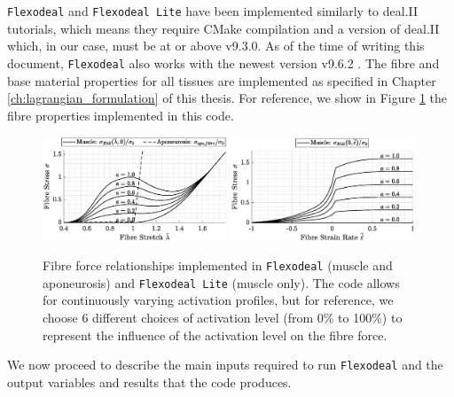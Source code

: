 \documentclass{sfuthesis}
\numberwithin{equation}{section}
\numberwithin{figure}{chapter}
\numberwithin{table}{chapter}
\theoremstyle{definition}
\begin{document}
\texttt{Flexodeal} and \texttt{Flexodeal Lite} have been implemented similarly to deal.II tutorials, which means they require CMake compilation and a version of deal.II which, in our case, must be at or above v9.3.0. As of the time of writing this document, \texttt{Flexodeal} also works with the newest version v9.6.2 \cite{dealii962}. The fibre and base material properties for all tissues are implemented as specified in Chapter \ref{ch:lagrangian_formulation} of this thesis. For reference, we show in Figure \ref{fig:FL_curves_diff_act} the fibre properties implemented in this code.

\begin{figure}
    \centering
    \includegraphics[width=0.49\textwidth]{fibre-FL-diff-a.eps}
    \includegraphics[width=0.49\textwidth]{fibre-FV-diff-a.eps}
    \caption{Fibre force relationships implemented in \texttt{Flexodeal} (muscle and aponeurosis) and \texttt{Flexodeal Lite} (muscle only). The code allows for continuously varying activation profiles, but for reference, we choose 6 different choices of activation level (from 0\% to 100\%) to represent the influence of the activation level on the fibre force. 
    \label{fig:FL_curves_diff_act}}
\end{figure}

We now proceed to describe the main inputs required to run \texttt{Flexodeal} and the output variables and results that the code produces. 
\end{document}

